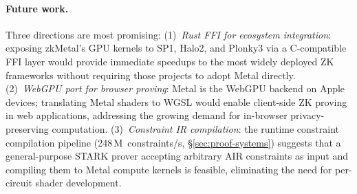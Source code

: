 \paragraph{Future work.}
Three directions are most promising:
(1)~\emph{Rust FFI for ecosystem integration}: exposing zkMetal's GPU kernels to SP1, Halo2, and Plonky3 via a C-compatible FFI layer would provide immediate speedups to the most widely deployed ZK frameworks without requiring those projects to adopt Metal directly.
(2)~\emph{WebGPU port for browser proving}: Metal is the WebGPU backend on Apple devices; translating Metal shaders to WGSL would enable client-side ZK proving in web applications, addressing the growing demand for in-browser privacy-preserving computation.
(3)~\emph{Constraint IR compilation}: the runtime constraint compilation pipeline (248\,M~constraints/s, \S\ref{sec:proof-systems}) suggests that a general-purpose STARK prover accepting arbitrary AIR constraints as input and compiling them to Metal compute kernels is feasible, eliminating the need for per-circuit shader development.
